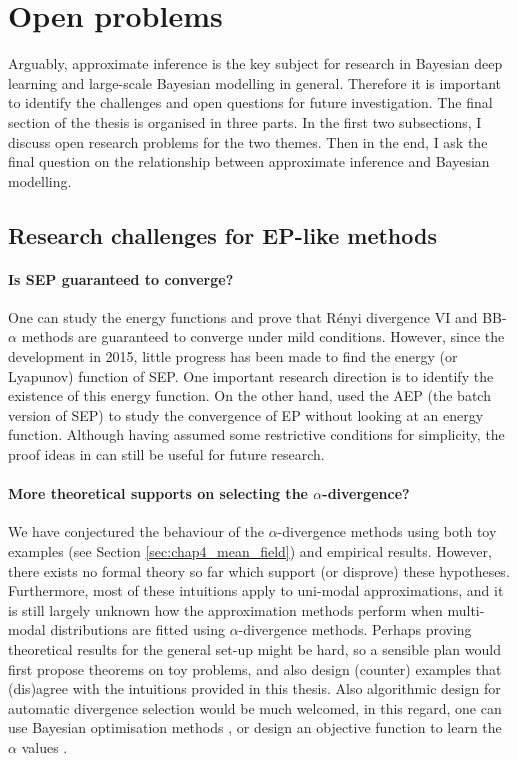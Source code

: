 \section{Open problems}
\label{sec:conclusion_future}

Arguably, approximate inference is the key subject for research in Bayesian deep learning and large-scale Bayesian modelling in general. Therefore it is important to identify the challenges and open questions for future investigation. The final section of the thesis is organised in three parts. In the first two subsections, I discuss open research problems for the two themes. Then in the end, I ask the final question on the relationship between approximate inference and Bayesian modelling. 

\subsection{Research challenges for EP-like methods}
\paragraph{Is SEP guaranteed to converge? \\}
One can study the energy functions and prove that R{\'e}nyi divergence VI and BB-$\alpha$ methods are guaranteed to converge under mild conditions. However, since the development in 2015, little progress has been made to find the energy (or Lyapunov) function of SEP. One important research direction is to identify the existence of this energy function. On the other hand, \citet{dehaene:aep2015, dehaene:aep2018} used the AEP (the batch version of SEP) to study the convergence of EP without looking at an energy function. Although having assumed some restrictive conditions for simplicity, the proof ideas in \citet{dehaene:aep2015, dehaene:aep2018} can still be useful for future research. 

\paragraph{More theoretical supports on selecting the $\alpha$-divergence? \\}
We have conjectured the behaviour of the $\alpha$-divergence methods using both toy examples (see Section \ref{sec:chap4_mean_field}) and empirical results. However, there exists no formal theory so far which support (or disprove) these hypotheses. Furthermore, most of these intuitions apply to uni-modal approximations, and it is still largely unknown how the approximation methods perform when multi-modal distributions are fitted using $\alpha$-divergence methods. Perhaps proving theoretical results for the general set-up might be hard, so a sensible plan would first propose theorems on toy problems, and also design (counter) examples that (dis)agree with the intuitions provided in this thesis. Also algorithmic design for automatic divergence selection would be much welcomed, in this regard, one can use Bayesian optimisation methods \citep{movckus:bo1975, snoek:bo2012}, or design an objective function to learn the $\alpha$ values \citep{dikmen:divergence2015}.

